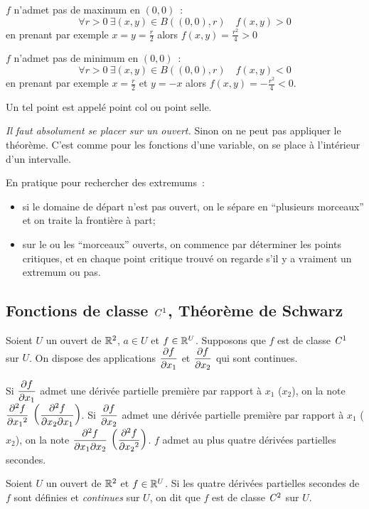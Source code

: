 $f$ n'admet pas de maximum en $(0,0)$~:
\begin{equation}
  \forall r>0 \ \exists (x,y) \in B((0,0), r) \quad f(x, y)>0
\end{equation}
en prenant par exemple $x=y=\frac{r}{2}$ alors $f(x,y)=\frac{r^2}{4}>0$

$f$ n'admet pas de minimum en $(0,0)$~:
\begin{equation}
  \forall r>0 \ \exists (x,y) \in B((0,0), r) \quad f(x, y)<0
\end{equation}
en prenant par exemple $x=\frac{r}{2}$ et $y=-x$ alors $f(x,y)=-\frac{r^2}{4}<0$.

Un tel point est appelé point col ou point selle.

\emph{Il faut absolument se placer sur un ouvert.} Sinon on ne peut pas appliquer le théorème. C'est comme pour les fonctions d'une variable, on se place à l'intérieur d'un intervalle.

En pratique pour rechercher des extremums~:
\begin{itemize}
\item si le domaine de départ n'est pas ouvert, on le sépare en ``plusieurs morceaux'' et on traite la frontière à part;
\item sur le ou les ``morceaux'' ouverts, on commence par déterminer les points critiques, et en chaque point critique trouvé on regarde s'il y a vraiment un extremum ou pas.
\end{itemize}

\subsection{Fonctions de classe $\mathit{C}^1$, Théorème de Schwarz}

Soient $U$ un ouvert de $\mathbb{R}^2$, $a \in U$ et $f \in \mathbb{R}^U$. Supposons que $f$ est de classe $\mathit{C}^1$ sur $U$. On dispose des applications $\dfrac{\partial f}{\partial x_1}$ et $\dfrac{\partial f}{\partial x_2}$ qui sont continues. 

Si $\dfrac{\partial f}{\partial x_1}$ admet une dérivée partielle première par rapport à $x_1$ ($x_2$), on la note $\dfrac{\partial^2 f}{\partial {x_1}^2}$ $\left( \dfrac{\partial^2 f}{\partial {x_2} \partial {x_1}}\right)$. Si $\dfrac{\partial f}{\partial x_2}$ admet une dérivée partielle première par rapport à $x_1$ ($x_2$), on la note $\dfrac{\partial^2 f}{\partial {x_1} \partial {x_2}}$ $\left(\dfrac{\partial^2 f}{\partial {x_2}^2}\right)$. $f$ admet au plus quatre dérivées partielles secondes.

\begin{defdef}
  Soient $U$ un ouvert de $\mathbb{R}^2$ et $f \in \mathbb{R}^U$. Si les quatre dérivées partielles secondes de $f$ sont définies et \emph{continues} sur $U$, on dit que $f$ est de classe $\mathit{C}^2$ sur $U$.
\end{defdef}

